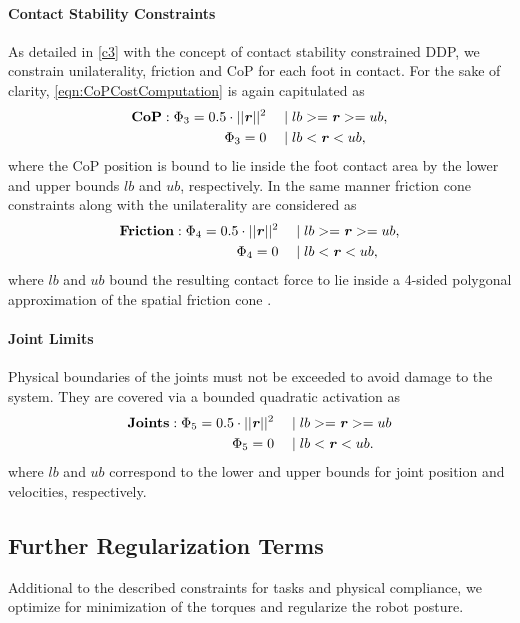 \paragraph{Contact Stability Constraints}
As detailed in \cref{c3} with the concept of contact stability constrained \gls{DDP}, we constrain unilaterality, friction and \gls{CoP} for each foot in contact. For the sake of clarity, \cref{eqn:CoPCostComputation} is again capitulated as 
\begin{align*}
\begin{split}
\textbf{CoP}: \Phi_3 = 0.5 \cdot ||\bm{\mathit{r}}||^2 \quad &\mid lb >= \bm{\mathit{r}} >= ub, \\
\Phi_3 = 0 \quad &\mid lb < \bm{\mathit{r}} < ub,
\end{split}
\end{align*}
where the \gls{CoP} position is bound to lie inside the foot contact area by the lower and upper bounds $lb$ and $ub$, respectively.
In the same manner friction cone constraints along with the unilaterality are considered as
\begin{align*}
\begin{split}
\textbf{Friction}: \Phi_4 = 0.5 \cdot ||\bm{\mathit{r}}||^2 \quad &\mid lb >= \bm{\mathit{r}} >= ub, \\
\Phi_4 = 0 \quad &\mid lb < \bm{\mathit{r}} < ub,
\end{split}
\end{align*}
where $lb$ and $ub$ bound the resulting contact force to lie inside a 4-sided polygonal approximation of the spatial friction cone \cite{kao2016contact}.

\paragraph{Joint Limits}
Physical boundaries of the joints must not be exceeded to avoid damage to the system. They are covered via a bounded quadratic activation as
\begin{align*}
\begin{split}
\textbf{Joints}: \Phi_5 = 0.5 \cdot ||\bm{\mathit{r}}||^2 \quad &\mid lb >= \bm{\mathit{r}} >= ub \\
\Phi_5 = 0 \quad &\mid lb < \bm{\mathit{r}} < ub.
\end{split}
\end{align*}
where $lb$ and $ub$ correspond to the lower and upper bounds for joint position and velocities, respectively. 

\subsection{Further Regularization Terms}
Additional to the described constraints for tasks and physical compliance, we optimize for minimization of the torques and regularize the robot posture.
